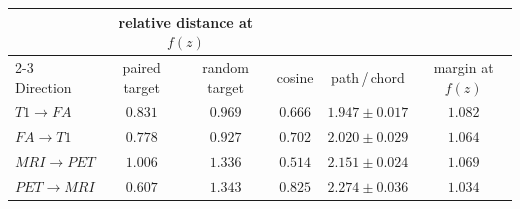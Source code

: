 
\begin{tabular}{lccccc}
\toprule
& \multicolumn{2}{c}{relative distance at $f(z)$} & & & \\
\cmidrule(lr){2-3}
Direction & paired target & random target & cosine & path\,/\,chord & margin at $f(z)$ \\
\midrule
$T1\rightarrow FA$ & $0.831$ & $0.969$ & $0.666$ & $1.947 \pm 0.017$ & $1.082$ \\
$FA\rightarrow T1$ & $0.778$ & $0.927$ & $0.702$ & $2.020 \pm 0.029$ & $1.064$ \\
$MRI\rightarrow PET$ & $1.006$ & $1.336$ & $0.514$ & $2.151 \pm 0.024$ & $1.069$ \\
$PET\rightarrow MRI$ & $0.607$ & $1.343$ & $0.825$ & $2.274 \pm 0.036$ & $1.034$ \\
\bottomrule
\end{tabular}
